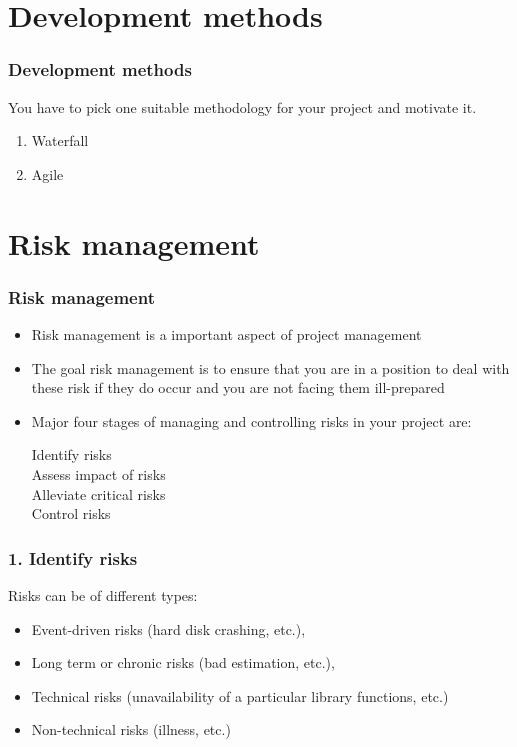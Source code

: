 \documentclass{beamer}
\begin{document}
\section{Development methods} %
\label{sec:development_methods}
\begin{frame}[t]\frametitle{Development methods}
You have to pick one suitable methodology for your project and motivate it.
\begin{enumerate}
    \item Waterfall
     \item Agile
\end{enumerate}
\end{frame}

\section{Risk management} %
\label{sec:risk_management}
\begin{frame}[t]\frametitle{Risk management}
    \begin{itemize}
        \item Risk management is a important aspect of project management
        \item The goal risk management is to ensure that you are in a position to deal with these risk if they do occur and you are not facing them ill-prepared
        \item Major four stages of managing and controlling risks in your project are:
        \begin{description}
            \item[Identify risks]
            \item[Assess impact of risks]
            \item[Alleviate critical risks]
            \item[Control risks]
        \end{description}
    \end{itemize}
\end{frame}

\begin{frame}[t]\frametitle{1. Identify risks}
Risks can be of different types:
    \begin{itemize}
        \item Event-driven risks (hard disk crashing, etc.),
        \item Long term or chronic risks (bad estimation, etc.),
        \item Technical risks (unavailability of a particular library functions, etc.)
        \item Non-technical risks (illness, etc.)
    \end{itemize}
\end{frame}
\end{document}
